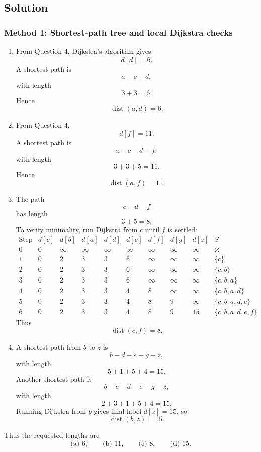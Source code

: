 \documentclass[12pt]{article}
\DeclareMathOperator{\dist}{dist}
\begin{document}
\subsection{Solution}

\subsubsection{Method 1: Shortest-path tree and local Dijkstra checks}
\begin{enumerate}[label=(\alph*)]
  \item From Question 4, Dijkstra's algorithm gives
  \[
    d[d]=6.
  \]
  A shortest path is
  \[
    a-c-d,
  \]
  with length
  \[
    3+3=6.
  \]
  Hence
  \[
    \boxed{\dist(a,d)=6.}
  \]

  \item From Question 4,
  \[
    d[f]=11.
  \]
  A shortest path is
  \[
    a-c-d-f,
  \]
  with length
  \[
    3+3+5=11.
  \]
  Hence
  \[
    \boxed{\dist(a,f)=11.}
  \]

  \item The path
  \[
    c-d-f
  \]
  has length
  \[
    3+5=8.
  \]
  To verify minimality, run Dijkstra from $c$ until $f$ is settled:
  \[
  \begin{array}{c|cccccccc|l}
  \text{Step} & d[c]&d[b]&d[a]&d[d]&d[e]&d[f]&d[g]&d[z] & S\\ \hline
  0 & 0&\infty&\infty&\infty&\infty&\infty&\infty&\infty&\varnothing\\
  1 & 0&2&3&3&6&\infty&\infty&\infty&\{c\}\\
  2 & 0&2&3&3&6&\infty&\infty&\infty&\{c,b\}\\
  3 & 0&2&3&3&6&\infty&\infty&\infty&\{c,b,a\}\\
  4 & 0&2&3&3&4&8&\infty&\infty&\{c,b,a,d\}\\
  5 & 0&2&3&3&4&8&9&\infty&\{c,b,a,d,e\}\\
  6 & 0&2&3&3&4&8&9&15&\{c,b,a,d,e,f\}
  \end{array}
  \]
  Thus
  \[
    \boxed{\dist(c,f)=8.}
  \]

  \item A shortest path from $b$ to $z$ is
  \[
    b-d-e-g-z,
  \]
  with length
  \[
    5+1+5+4=15.
  \]
  Another shortest path is
  \[
    b-c-d-e-g-z,
  \]
  with length
  \[
    2+3+1+5+4=15.
  \]
  Running Dijkstra from $b$ gives final label $d[z]=15$, so
  \[
    \boxed{\dist(b,z)=15.}
  \]
\end{enumerate}

Thus the requested lengths are
\[
  \boxed{\text{(a) }6,\qquad \text{(b) }11,\qquad \text{(c) }8,\qquad \text{(d) }15.}
\]
\end{document}
